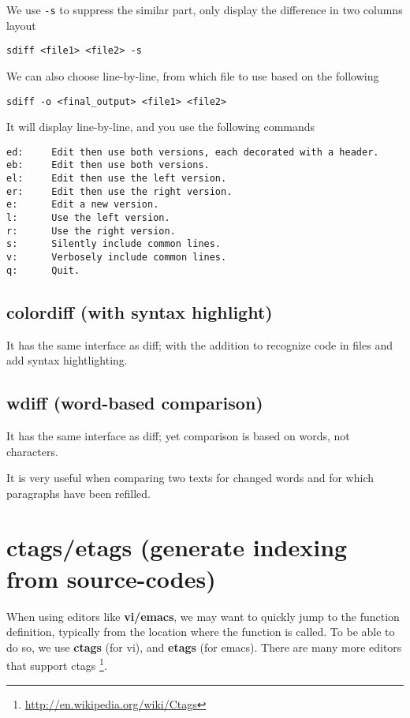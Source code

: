 We use \verb!-s! to suppress the similar part, only display the difference in
two columns layout
\begin{verbatim}
sdiff <file1> <file2> -s
\end{verbatim}


We can also choose line-by-line, from which file to use based on the following
\begin{verbatim}
sdiff -o <final_output> <file1> <file2>
\end{verbatim}
It will display line-by-line, and you use the following commands
\begin{verbatim}
ed:     Edit then use both versions, each decorated with a header.
eb:     Edit then use both versions.
el:     Edit then use the left version.
er:     Edit then use the right version.
e:      Edit a new version.
l:      Use the left version.
r:      Use the right version.
s:      Silently include common lines.
v:      Verbosely include common lines.
q:      Quit.
\end{verbatim}





\subsection{colordiff (with syntax highlight)}
\label{sec:colordiff}

It has the same interface as diff; with the addition to recognize code in files
and add syntax hightlighting.

\subsection{wdiff (word-based comparison)}
\label{sec:wdiff}

It has the same interface as diff; yet comparison is based on words, not
characters.

It is very useful when comparing two texts for changed words and for which
paragraphs have been refilled.


\section{ctags/etags (generate indexing from source-codes)}
\label{sec:ctags}
\label{sec:etags}

When using editors like {\bf vi/emacs}, we may want to quickly jump to the
function definition, typically from the location where the function is called.
To be able to do so, we use {\bf ctags} (for vi), and {\bf etags} (for emacs).
There are many more editors that support ctags
\footnote{\url{http://en.wikipedia.org/wiki/Ctags}}.

